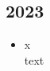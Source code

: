 \subsection*{2023}
\begin{history}


    \begin{itemize}

        \item x\\
              text

    \end{itemize}

\end{history}
